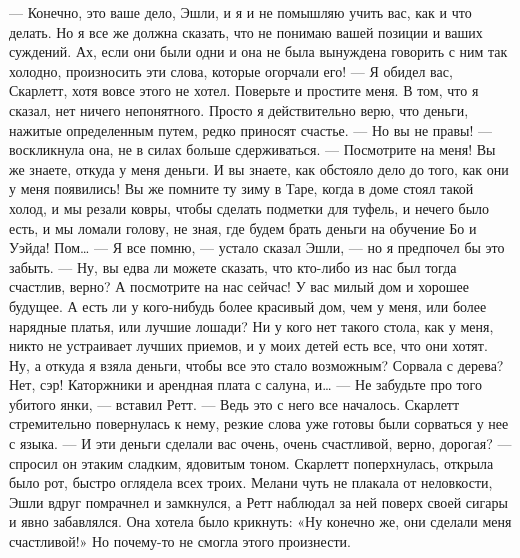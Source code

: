 — Конечно, это ваше дело, Эшли, и я и не помышляю учить вас, как и что делать. Но я все же должна сказать, что не понимаю вашей позиции и ваших суждений.
Ах, если они были одни и она не была вынуждена говорить с ним так холодно, произносить эти слова, которые огорчали его!
— Я обидел вас, Скарлетт, хотя вовсе этого не хотел. Поверьте и простите меня. В том, что я сказал, нет ничего непонятного. Просто я действительно верю, что деньги, нажитые определенным путем, редко приносят счастье.
— Но вы не правы! — воскликнула она, не в силах больше сдерживаться. — Посмотрите на меня! Вы же знаете, откуда у меня деньги. И вы знаете, как обстояло дело до того, как они у меня появились! Вы же помните ту зиму в Таре, когда в доме стоял такой холод, и мы резали ковры, чтобы сделать подметки для туфель, и нечего было есть, и мы ломали голову, не зная, где будем брать деньги на обучение Бо и Уэйда! Пом…
— Я все помню, — устало сказал Эшли, — но я предпочел бы это забыть.
— Ну, вы едва ли можете сказать, что кто-либо из нас был тогда счастлив, верно? А посмотрите на нас сейчас! У вас милый дом и хорошее будущее. А есть ли у кого-нибудь более красивый дом, чем у меня, или более нарядные платья, или лучшие лошади? Ни у кого нет такого стола, как у меня, никто не устраивает лучших приемов, и у моих детей есть все, что они хотят. Ну, а откуда я взяла деньги, чтобы все это стало возможным? Сорвала с дерева? Нет, сэр! Каторжники и арендная плата с салуна, и…
— Не забудьте про того убитого янки, — вставил Ретт. — Ведь это с него все началось.
Скарлетт стремительно повернулась к нему, резкие слова уже готовы были сорваться у нее с языка.
— И эти деньги сделали вас очень, очень счастливой, верно, дорогая? — спросил он этаким сладким, ядовитым тоном.
Скарлетт поперхнулась, открыла было рот, быстро оглядела всех троих. Мелани чуть не плакала от неловкости, Эшли вдруг помрачнел и замкнулся, а Ретт наблюдал за ней поверх своей сигары и явно забавлялся. Она хотела было крикнуть: «Ну конечно же, они сделали меня счастливой!» Но почему-то не смогла этого произнести.

